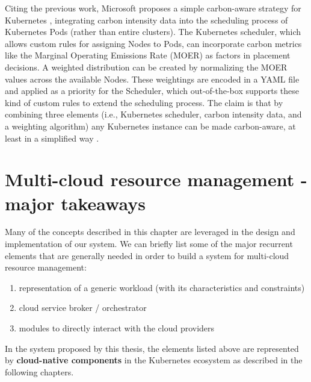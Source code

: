 Citing the previous work, Microsoft proposes a simple carbon-aware strategy for Kubernetes \cite{microsoft_carbon_aware_k8s}, integrating carbon intensity data into the scheduling process of Kubernetes Pods (rather than entire clusters).
The Kubernetes scheduler, which allows custom rules for assigning Nodes to Pods, can incorporate carbon metrics like the Marginal Operating Emissions Rate (MOER) as factors in placement decisions. 
A weighted distribution can be created by normalizing the MOER values across the available Nodes.
These weightings are encoded in a YAML file and applied as a priority for the Scheduler, which out-of-the-box supports these kind of custom rules to extend the scheduling process.
The claim is that by combining three elements (i.e., Kubernetes scheduler, carbon intensity data, and a weighting algorithm) any Kubernetes instance can be made carbon-aware, at least in a simplified way \cite{microsoft_carbon_aware_k8s}.

\section{Multi-cloud resource management - major takeaways}

Many of the concepts described in this chapter are leveraged in the design and implementation of our system. 
We can briefly list some of the major recurrent elements that are generally needed in order to build a system for multi-cloud resource management:
\begin{enumerate}
    \item representation of a generic workload (with its characteristics and constraints)
    \item cloud service broker / orchestrator
    \item modules to directly interact with the cloud providers
\end{enumerate}

In the system proposed by this thesis, the elements listed above are represented by \textbf{cloud-native components} in the Kubernetes ecosystem as described in the following chapters.

\newpage
